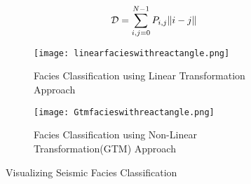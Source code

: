 \documentclass[a4paper]{article}
\begin{document}
\begin{equation}
\mathcal{D}=\sum\limits_{i,j=0}^{N-1} P_{i,j} \Arrowvert i-j \Arrowvert \label{eq-11}
\end{equation}
\begin{figure*}[!t]
\centering
\begin{subfigure}{1\textwidth}
\centering
\texttt{[image: linearfacieswithreactangle.png]}
\caption{Facies Classification using Linear Transformation Approach}
\label{fig:left1}
\end{subfigure}
\begin{subfigure}{1\textwidth}
\centering
\texttt{[image: Gtmfacieswithreactangle.png]}
\caption{Facies Classification using Non-Linear Transformation(GTM) Approach}
\label{fig:right1}
\end{subfigure}
\caption{Visualizing Seismic Facies Classification }
\label{fig:combined1}
\end{figure*}
\end{document}
